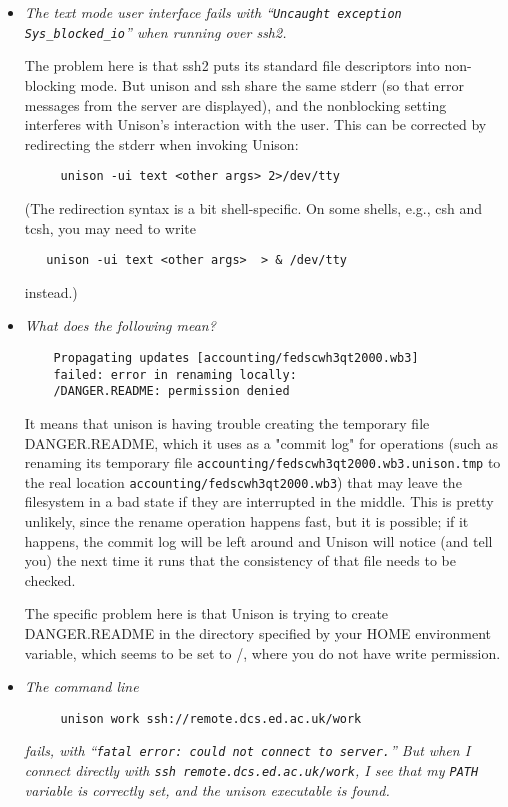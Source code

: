 \begin{itemize}
\item {\em The text mode user interface fails with 
``\verb|Uncaught exception Sys_blocked_io|'' when running over ssh2.}

The problem here is that ssh2 puts its standard file descriptors into
non-blocking mode.  But unison and  ssh share the same stderr (so that
error messages from the server are displayed), and the nonblocking
setting interferes with Unison's interaction with the user.  This can be
corrected by redirecting the stderr when invoking Unison:
\begin{verbatim}
     unison -ui text <other args> 2>/dev/tty
\end{verbatim}
(The redirection syntax is a bit shell-specific.  On some shells, e.g.,
   csh and tcsh, you may need to write
\begin{verbatim}
   unison -ui text <other args>  > & /dev/tty
\end{verbatim}
instead.)   

\item {\em What does the following mean?}
\begin{verbatim}
    Propagating updates [accounting/fedscwh3qt2000.wb3]
    failed: error in renaming locally:
    /DANGER.README: permission denied
\end{verbatim}

It means that unison is having trouble creating the temporary file
DANGER.README, which it uses as a "commit log" for operations (such as
renaming its temporary file {\tt accounting/fedscwh3qt2000.wb3.unison.tmp} to
the real location {\tt accounting/fedscwh3qt2000.wb3}) that may leave the
filesystem in a bad state if they are interrupted in the middle.  This is
pretty unlikely, since the rename operation happens fast, but it is
possible; if it happens, the commit log will be left around and Unison
will notice (and tell you) the next time it runs that the consistency of
that file needs to be checked.

The specific problem here is that Unison is trying to create
DANGER.README in the directory specified by your HOME environment
variable, which seems to be set to /, where you do not have write
permission.

\item {\em 
The command line}
\begin{verbatim}
     unison work ssh://remote.dcs.ed.ac.uk/work
\end{verbatim}
{\em fails, with ``{\tt fatal error: could not connect to server.}''
But when I connect directly with {\tt ssh remote.dcs.ed.ac.uk/work},
I see that my {\tt PATH} variable is correctly set, and the unison
executable is found. }


\end{itemize}
